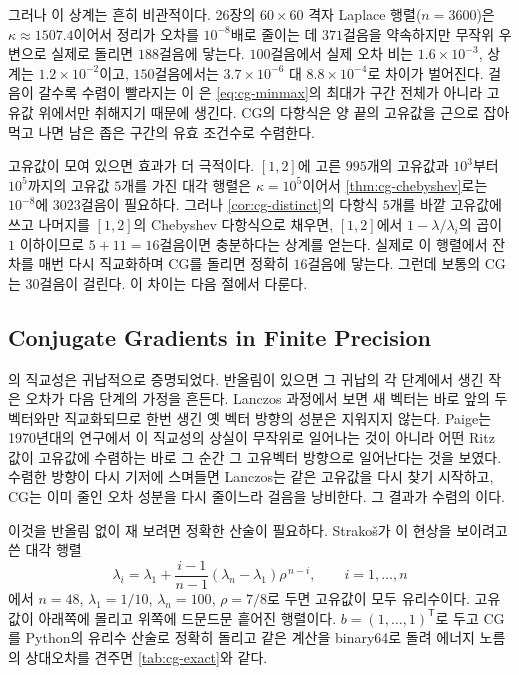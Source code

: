 그러나 이 상계는 흔히 비관적이다. 26장의 $60\times60$ 격자 Laplace 행렬($n=3600$)은 $\kappa\approx1507.4$이어서 정리가 오차를 $10^{-8}$배로 줄이는 데 $371$걸음을 약속하지만 무작위 우변으로 실제로 돌리면 $188$걸음에 닿는다. $100$걸음에서 실제 오차 비는 $1.6\times10^{-3}$, 상계는 $1.2\times10^{-2}$이고, $150$걸음에서는 $3.7\times10^{-6}$ 대 $8.8\times10^{-4}$로 차이가 벌어진다. 걸음이 갈수록 수렴이 빨라지는 이 은 \eqref{eq:cg-minmax}의 최대가 구간 전체가 아니라 고유값 위에서만 취해지기 때문에 생긴다. CG의 다항식은 양 끝의 고유값을 근으로 잡아 먹고 나면 남은 좁은 구간의 유효 조건수로 수렴한다.

고유값이 모여 있으면 효과가 더 극적이다. $[1,2]$에 고른 $995$개의 고유값과 $10^3$부터 $10^5$까지의 고유값 $5$개를 가진 대각 행렬은 $\kappa=10^5$이어서 \cref{thm:cg-chebyshev}로는 $10^{-8}$에 $3023$걸음이 필요하다. 그러나 \cref{cor:cg-distinct}의 다항식 $5$개를 바깥 고유값에 쓰고 나머지를 $[1,2]$의 Chebyshev 다항식으로 채우면, $[1,2]$에서 $1-\lambda/\lambda_i$의 곱이 $1$ 이하이므로 $5+11=16$걸음이면 충분하다는 상계를 얻는다. 실제로 이 행렬에서 잔차를 매번 다시 직교화하며 CG를 돌리면 정확히 $16$걸음에 닿는다. 그런데 보통의 CG는 $30$걸음이 걸린다. 이 차이는 다음 절에서 다룬다.

\subsection{Conjugate Gradients in Finite Precision}
\label{sec:cg-finite}

의 직교성은 귀납적으로 증명되었다. 반올림이 있으면 그 귀납의 각 단계에서 생긴 작은 오차가 다음 단계의 가정을 흔든다. Lanczos 과정에서 보면 새 벡터는 바로 앞의 두 벡터와만 직교화되므로 한번 생긴 옛 벡터 방향의 성분은 지워지지 않는다. Paige는 1970년대의 연구에서 이 직교성의 상실이 무작위로 일어나는 것이 아니라 어떤 Ritz 값이 고유값에 수렴하는 바로 그 순간 그 고유벡터 방향으로 일어난다는 것을 보였다\cite{paige1976error,meurant2006}. 수렴한 방향이 다시 기저에 스며들면 Lanczos는 같은 고유값을 다시 찾기 시작하고, CG는 이미 줄인 오차 성분을 다시 줄이느라 걸음을 낭비한다. 그 결과가 수렴의 이다.

이것을 반올림 없이 재 보려면 정확한 산술이 필요하다. Strakoš가 이 현상을 보이려고 쓴 대각 행렬\cite{strakos1991}
\[
\lambda_i=\lambda_1+\frac{i-1}{n-1}(\lambda_n-\lambda_1)\rho^{\,n-i},\qquad i=1,\dots,n
\]
에서 $n=48$, $\lambda_1=1/10$, $\lambda_n=100$, $\rho=7/8$로 두면 고유값이 모두 유리수이다. 고유값이 아래쪽에 몰리고 위쪽에 드문드문 흩어진 행렬이다. $b=(1,\dots,1)^{\mathsf T}$로 두고 CG를 Python의 유리수 산술로 정확히 돌리고 같은 계산을 binary64로 돌려 에너지 노름의 상대오차를 견주면 \cref{tab:cg-exact}와 같다.

